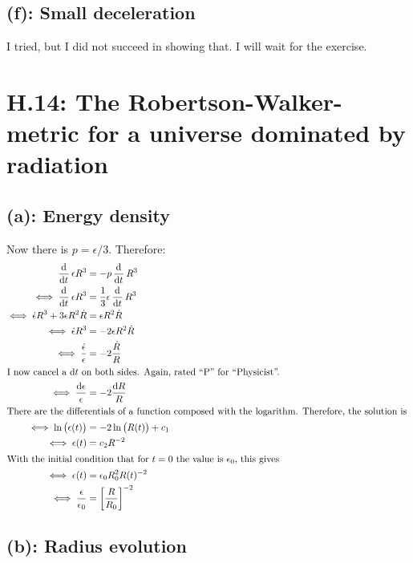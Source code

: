 \subsection*{(f): Small deceleration}

I tried, but I did not succeed in showing that. I will wait for the exercise.

\section*{H.14: The Robertson-Walker-metric for a universe dominated by
radiation}

\subsection*{(a): Energy density}

Now there is $p = \epsilon/3$. Therefore:
\begin{align*}
    \dod{}t \epsilon R^3 &= - p \dod{}t R^3 \\
    \iff \dod{}t \epsilon R^3 &= \frac13 \epsilon \dod{}t R^3 \\
    \iff \dot \epsilon R^3 + 3 \epsilon R^2 \dot R &= \epsilon R^2 \dot R \\
    \iff \dot \epsilon R^3 &= - 2 \epsilon R^2 \dot R \\
    \iff \frac{\dot\epsilon}{\epsilon} &= -2 \frac{\dot R}{R} \\
    \intertext{%
        I now cancel a $\dif t$ on both sides. Again, rated “P” for
        “Physicist”.
    }
    \iff \frac{\dif\epsilon}{\epsilon} &= -2 \frac{\dif R}{R} \\
    \intertext{%
        There are the differentials of a function composed with the logarithm.
        Therefore, the solution is
    }
    \iff \ln\del{\epsilon(t)} &= -2 \ln\del{R(t)} + c_1 \\
    \iff \epsilon(t) &= c_2 R^{-2} \\
    \intertext{%
        With the initial condition that for $t = 0$ the value is $\epsilon_0$,
        this gives
    }
    \iff \epsilon(t) &= \epsilon_0 R_0^2 R(t)^{-2} \\
    \iff \frac{\epsilon}{\epsilon_0} &= \sbr{\frac{R}{R_0}}^{-2}
\end{align*}

\subsection*{(b): Radius evolution}

